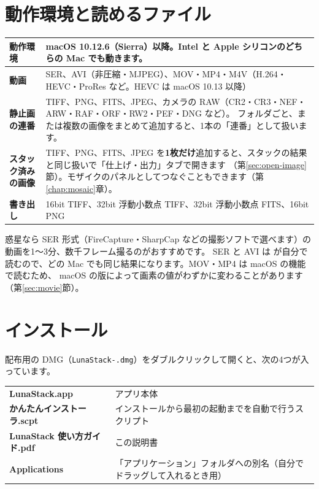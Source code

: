 \section{動作環境と読めるファイル}

\begin{tabularx}{\linewidth}{@{}>{\sffamily\bfseries}l X@{}}
\toprule
動作環境 & macOS 10.12.6（Sierra）以降。Intel と Apple シリコンのどちらの Mac でも動きます。\\
\midrule
動画 & SER、AVI（非圧縮・MJPEG）、MOV・MP4・M4V（H.264・HEVC・ProRes など。HEVC は macOS 10.13 以降）\\
静止画の連番 & TIFF、PNG、FITS、JPEG、カメラの RAW（CR2・CR3・NEF・ARW・RAF・ORF・RW2・PEF・DNG など）。
  フォルダごと、または複数の画像をまとめて追加すると、1本の「連番」として扱います。\\
スタック済みの画像 & TIFF、PNG、FITS、JPEG を\textbf{1枚だけ}追加すると、スタックの結果と同じ扱いで「仕上げ・出力」タブで開きます
  （第\ref{sec:open-image}節）。モザイクのパネルとしてつなぐこともできます（第\ref{chap:mosaic}章）。\\
書き出し & 16bit TIFF、32bit 浮動小数点 TIFF、32bit 浮動小数点 FITS、16bit PNG\\
\bottomrule
\end{tabularx}

\begin{tip}[おすすめの撮り方]
  惑星なら SER 形式（FireCapture・SharpCap などの撮影ソフトで選べます）の動画を1〜3分、数千フレーム撮るのがおすすめです。
  SER と AVI は \LS が自分で読むので、どの Mac でも同じ結果になります。MOV・MP4 は macOS の機能で読むため、
  macOS の版によって画素の値がわずかに変わることがあります（第\ref{sec:movie}節）。
\end{tip}

\section{インストール}\label{sec:install}

配布用の DMG（\texttt{LunaStack-\version.dmg}）をダブルクリックして開くと、次の4つが入っています。

\begin{center}\small
\begin{tabularx}{0.92\linewidth}{@{}>{\sffamily\bfseries}l X@{}}
\toprule
LunaStack.app & アプリ本体\\
かんたんインストーラ.scpt & インストールから最初の起動までを自動で行うスクリプト\\
LunaStack 使い方ガイド.pdf & この説明書\\
Applications & 「アプリケーション」フォルダへの別名（自分でドラッグして入れるとき用）\\
\bottomrule
\end{tabularx}
\end{center}

